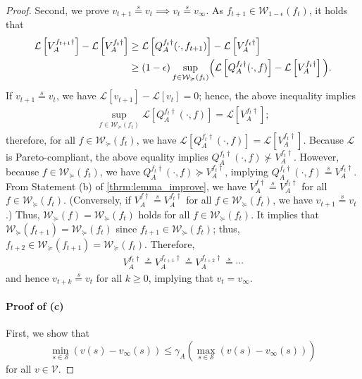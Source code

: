 \documentclass{acml}
\providecommand{\eqs}{\stackrel{s}{=}}
\begin{document}
\begin{proof}
	Second, we prove $v_{t+1} \eqs v_{t} \implies v_t \eqs v_\infty$.
	As $f_{t+1}\in\mathcal{W}_{1-\epsilon}(f_t)$, it holds that
	\begin{align}
		\mathcal{L} \left[ V_A^{f_{t+1}\dag} \right] - \mathcal{L}\left[ V_A^{f_t\dag} \right]
		&\ge 
		\mathcal{L} \left[ Q_A^{f_t\dag}(\cdot,f_{t+1}) \right] - \mathcal{L}\left[ V_A^{f_t\dag} \right]\\
		&\ge (1 - \epsilon) \sup_{f \in \mathcal{W}_\succcurlyeq(f_t)} \Bigl(\mathcal{L}\left[ Q_A^{f_t\dag}(\cdot,f) \right] - \mathcal{L}\left[ V_A^{f_t\dag} \right]\Bigl). \label{eq:monotone_improve_3}
	\end{align}
	If $v_{t+1} \eqs v_{t}$, we have $\mathcal{L}[v_{t+1}]-\mathcal{L}[v_{t}] = 0$; hence, the above inequality implies
	\begin{align}
		\sup_{f \in \mathcal{W}_\succcurlyeq(f_t)} \mathcal{L}\left[ Q_A^{f_t\dag}(\cdot,f) \right] = \mathcal{L}\left[ V_A^{f_t\dag} \right]; 
	\end{align}
	therefore, for all $f \in \mathcal{W}_\succcurlyeq(f_t)$, we have 
	$\mathcal{L}\left[ Q_A^{f_t\dag}(\cdot,f) \right] = \mathcal{L}\left[ V_A^{f_t\dag} \right]$.
	Because $\mathcal{L}$ is Pareto-compliant, the above equality implies 
	$Q_A^{f_t\dag}(\cdot,f) \not \succ V_A^{f_t\dag}$.
	However, because $f \in \mathcal{W}_\succcurlyeq(f_t)$, we have $Q_A^{f_t\dag}(\cdot,f) \succcurlyeq V_A^{f_t\dag}$, implying $Q_A^{f_t\dag}(\cdot,f) \eqs V_A^{f_t\dag}$.
	From Statement (b) of \cref{thrm:lemma_improve}, we have $V_A^{f\dag} \eqs V_A^{f_t\dag}$ for all $f \in \mathcal{W}_\succcurlyeq(f_t)$.
	(Conversely, if $V_A^{f\dag} \eqs V_A^{f_t\dag}$ for all $f \in \mathcal{W}_\succcurlyeq(f_t)$, we have $v_{t+1} \eqs v_{t}$.)
	Thus, $\mathcal{W}_\succcurlyeq(f)=\mathcal{W}_\succcurlyeq(f_t)$ holds for all $f\in\mathcal{W}_\succcurlyeq(f_t)$.
	It implies that $\mathcal{W}_\succcurlyeq(f_{t+1})=\mathcal{W}_\succcurlyeq(f_t)$ since $f_{t+1}\in\mathcal{W}_\succcurlyeq(f_t)$; thus, $f_{t+2}\in\mathcal{W}_\succcurlyeq(f_{t+1})=\mathcal{W}_\succcurlyeq(f_t)$.
	Therefore, 
	\begin{align}
		V_A^{f_t\dag} \eqs V_A^{f_{t+1}\dag} \eqs V_A^{f_{t+2}\dag} \eqs \cdots
	\end{align}
	and hence $v_{t+k} \eqs v_{t}$ for all $k \ge 0$, implying that $v_{t} = v_\infty$.    
	
	\paragraph{Proof of (c)}
	First, we show that $$\min_{s \in \mathcal{S}} (v(s) - v_\infty(s))  \le \gamma_A( \max_{s \in \mathcal{S}} (v(s) - v_\infty(s)) )$$ for all $v\in \mathcal{V}$.
	

\end{proof}
\end{document}
